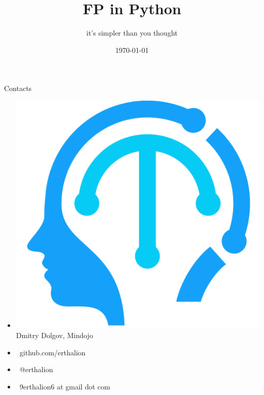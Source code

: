 \documentclass[18pt, compress]{beamer}
\title{FP in Python}
\subtitle{it's simpler than you thought}
\date{\today}
\institute{}
\def\twitter{{\FA \faTwitter}}
\def\github{{\FA \faGithubSign}}
\def\email{{\FA \faEnvelope}}
\begin{document}
\fontsize{17pt}{18}\selectfont
\maketitle

\section{}

\begin{frame}{Contacts}
    \begin{itemize}[label={}]
        \item \includegraphics[scale=0.04]{mindojo_logo.png} Dmitry Dolgov, Mindojo
        \item {\github\ github.com/erthalion}
        \item {\twitter\ @erthalion}
        \item \email\ 9erthalion6 at gmail dot com
    \end{itemize}
\end{frame}
\end{document}
